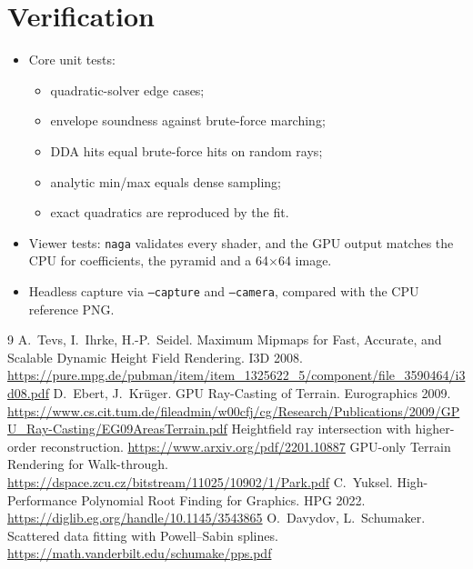 \documentclass[11pt]{article}
\begin{document}
\section*{Verification}
\begin{itemize}
\item Core unit tests:
  \begin{itemize}
  \item quadratic-solver edge cases;
  \item envelope soundness against brute-force marching;
  \item DDA hits equal brute-force hits on random rays;
  \item analytic min/max equals dense sampling;
  \item exact quadratics are reproduced by the fit.
  \end{itemize}
\item Viewer tests: \texttt{naga} validates every shader, and the GPU output matches the CPU for coefficients, the pyramid and a 64$\times$64 image.
\item Headless capture via \texttt{--capture} and \texttt{--camera}, compared with the CPU reference PNG.
\end{itemize}

\begin{thebibliography}{9}
 A.~Tevs, I.~Ihrke, H.-P.~Seidel. Maximum Mipmaps for Fast, Accurate, and Scalable Dynamic Height Field Rendering. I3D 2008. \url{https://pure.mpg.de/pubman/item/item_1325622_5/component/file_3590464/i3d08.pdf}
 D.~Ebert, J.~Kr\"uger. GPU Ray-Casting of Terrain. Eurographics 2009. \url{https://www.cs.cit.tum.de/fileadmin/w00cfj/cg/Research/Publications/2009/GPU_Ray-Casting/EG09AreasTerrain.pdf}
 Heightfield ray intersection with higher-order reconstruction. \url{https://www.arxiv.org/pdf/2201.10887}
 GPU-only Terrain Rendering for Walk-through. \url{https://dspace.zcu.cz/bitstream/11025/10902/1/Park.pdf}
 C.~Yuksel. High-Performance Polynomial Root Finding for Graphics. HPG 2022. \url{https://diglib.eg.org/handle/10.1145/3543865}
 O.~Davydov, L.~Schumaker. Scattered data fitting with Powell--Sabin splines. \url{https://math.vanderbilt.edu/schumake/pps.pdf}
\end{thebibliography}
\end{document}
